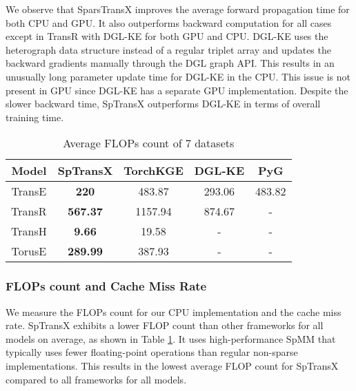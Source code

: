 We observe that SparsTransX improves the average forward propagation time for both CPU and GPU. It also outperforms backward computation for all cases except in TransR with DGL-KE for both GPU and CPU. DGL-KE uses the heterograph data structure instead of a regular triplet array and updates the backward gradients manually through the DGL graph API. This results in an unusually long parameter update time for DGL-KE in the CPU. This issue is not present in GPU since DGL-KE has a separate GPU implementation. Despite the slower backward time, SpTransX outperforms DGL-KE in terms of overall training time.

\begin{table}[h]
\centering
\caption{Average FLOPs count of 7 datasets }
\label{table:flops}
\begin{center}
\begin{small}
\begin{sc}
\begin{tabular}{ccccc}
\toprule
Model  & SpTransX       & TorchKGE & DGL-KE & PyG   \\
\midrule
TransE & \textbf{220}    & 483.87   & 293.06 & 483.82 \\
TransR & \textbf{567.37} & 1157.94  & 874.67 & -      \\
TransH & \textbf{9.66}   & 19.58    & -      & -      \\
TorusE & \textbf{289.99} & 387.93   & -      & -                        \\                        
\bottomrule
\end{tabular}
\end{sc}
\end{small}
\end{center}
\vskip -0.1in
\end{table}
\subsubsection{FLOPs count and Cache Miss Rate}
    We measure the FLOPs count for our CPU implementation and the cache miss rate. SpTransX exhibits a lower FLOP count than other frameworks for all models on average, as shown in Table \ref{table:flops}. It uses high-performance SpMM that typically uses fewer floating-point operations than regular non-sparse implementations. This results in the lowest average FLOP count for SpTransX compared to all frameworks for all models.

    

